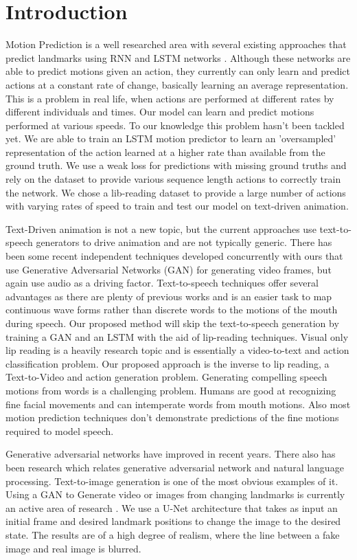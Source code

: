 \documentclass[10pt,twocolumn,letterpaper]{article}
\begin{document}
\section{Introduction}
 Motion Prediction is a well researched area with several existing approaches that predict landmarks using RNN and LSTM networks \cite{Authors16a,Authors16b,Authors16c}. Although these networks are able to predict motions given an action, they currently can only learn and predict actions at a constant rate of change, basically learning an average representation. This is a problem in real life, when actions are performed at different rates by different individuals and times. Our model can learn and predict motions performed at various speeds. To our knowledge this problem hasn't been tackled yet. We are able to train an LSTM motion predictor to learn an 'oversampled' representation of the action learned at a higher rate than available from the ground truth. We use a weak loss for predictions with missing ground truths and rely on the dataset to provide various sequence length actions to correctly train the network. We chose a lib-reading dataset to provide a large number of actions with varying rates of speed to train and test our model on text-driven animation.

 Text-Driven animation is not a new topic, but the current approaches use text-to-speech generators to drive animation and are not typically generic. There has been some recent independent techniques developed concurrently with ours that use Generative Adversarial Networks (GAN) for generating video frames, but again use audio as a driving factor. Text-to-speech techniques offer several advantages as there are plenty of previous works and is an easier task to map continuous wave forms rather than discrete words to the motions of the mouth during speech. Our proposed method will skip the text-to-speech generation by training a GAN and an LSTM with the aid of lip-reading techniques. Visual only lip reading is a heavily research topic and is essentially a video-to-text and action classification problem. Our proposed approach is the inverse to lip reading, a Text-to-Video and action generation problem. Generating compelling speech motions from words is a challenging problem. Humans are good at recognizing fine facial movements and can intemperate words from mouth motions. Also most motion prediction techniques don't demonstrate predictions of the fine motions required to model speech.

 Generative adversarial networks have improved in recent years. There also has been research which relates generative adversarial network and natural language processing. Text-to-image generation is one of the most obvious examples of it. Using a GAN to Generate video or images from changing landmarks is currently an active area of research \cite{Authors14a,Authors14b,Authors14c}. We use a U-Net architecture that takes as input an initial frame and desired landmark positions to change the image to the desired state. The results are of a high degree of realism, where the line between a fake image and real image is blurred.
 
\end{document}
